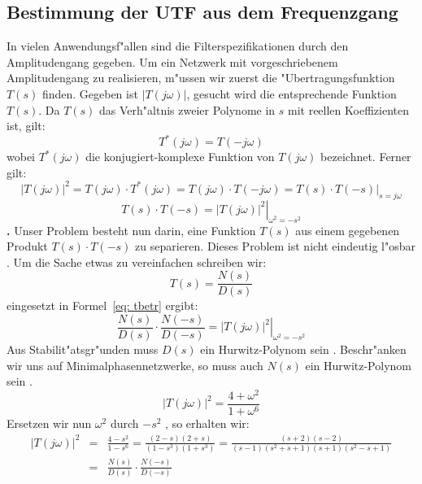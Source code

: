 \newpage
\subsection{Bestimmung der UTF aus dem Frequenzgang}
In vielen Anwendungsf"allen sind die Filterspezifikationen durch den
Amplitudengang gegeben. Um ein Netzwerk mit vorgeschriebenem
Amplitudengang zu realisieren, m"ussen wir zuerst die
"Ubertragungsfunktion $T(s)$ finden.  Gegeben ist $|T(j\omega)|$,
gesucht wird die entsprechende Funktion $T(s)$.  Da $T(s)$ das Verh"altnis
zweier Polynome in $s$ mit reellen Koeffizienten ist, gilt:
\begin{equation}
T^{*}(j\omega)=T(-j\omega)
\end{equation}
wobei $T^{*}(j\omega)$ die konjugiert-komplexe Funktion von
$T(j\omega)$ bezeichnet.  Ferner gilt:
\begin{equation*}
|T(j\omega)|^{2}=T(j\omega) \cdot T^{*}(j\omega)=T(j\omega) \cdot T(-j\omega)=T(s) \cdot T(-s)|_{s=j\omega}
\end{equation*}
\begin{equation}
T(s) \cdot T(-s)=\left. |T(j\omega)|^{2} 
\right|_{{\displaystyle\omega^{2}=-s^{2}}}\label{eq: tbetr}
\end{equation}
{\bf{}.}  Unser
Problem besteht nun darin, eine Funktion $T(s)$ aus einem gegebenen
Produkt $T(s)\cdot T(-s)$ zu separieren. Dieses Problem ist nicht
eindeutig l"osbar \cite{MOS:89}.  Um die Sache etwas zu vereinfachen
schreiben wir:
\begin{equation}
T(s)=\frac{N(s)}{D(s)}
\end{equation}
eingesetzt in Formel~\ref{eq: tbetr} ergibt:
\begin{equation}
\frac{N(s)}{D(s)} \cdot \frac{N(-s)}{D(-s)}=\left. |T(j\omega)|^{2}
\right|_{{\displaystyle\omega^{2}=-s^{2}}}
\end{equation}
Aus Stabilit"atsgr"unden muss $D(s)$ ein
Hurwitz-Polynom sein \cite{MOS:89}. Beschr"anken wir uns auf Minimalphasennetzwerke, so
muss auch $N(s)$ ein Hurwitz-Polynom sein \cite{UNB:81}.
\begin{equation*}
|T(j\omega)|^{2}=\frac{4+\omega^{2}}{1+\omega^{6}}
\end{equation*}
Ersetzen wir nun $\omega^{2}$ durch $-s^{2}$ , so erhalten wir:
\begin{eqnarray*}
|T(j\omega)|^{2}&=&\frac{4-s^{2}}{1-s^{6}}=\frac{(2-s)(2+s)}
                    {(1-s^{3})(1+s^{3})}=\frac{(s+2)(s-2)}{(s-1)(s^{2}+s+1)(s+1)(s^{2}-s+1)}\\
&=&\frac{N(s)}{D(s)}\cdot\frac{N(-s)}{D(-s)}
\end{eqnarray*}
